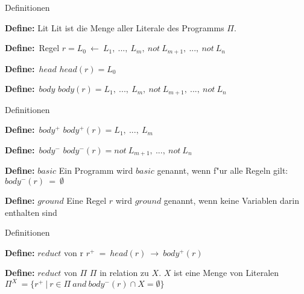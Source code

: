 \begin{frame}{Definitionen}
  \begin{block}{\textbf{Define:} Lit}
    Lit ist die Menge aller Literale des Programms $\Pi$.
  \end{block}
  \begin{block}{\textbf{Define:}~Regel}
    $r = L_0~\leftarrow~L_1,~...,~L_m,~not~L_{m+1},~...,~not~L_n$
  \end{block}
  \begin{block}{\textbf{Define:}~$head$}
    $head(r) = L_0$
  \end{block}
  \begin{block}{\textbf{Define:}~$body$}
    $body(r) = {L_1,~...,~L_m,~not~L_{m+1},~...,~not~L_n}$
  \end{block}
\end{frame}


\begin{frame}{Definitionen}
  \begin{block}{\textbf{Define:}~$body^+$}
    $body^+(r) = {L_1,~...,~L_m}$
  \end{block}
  \begin{block}{\textbf{Define:}~$body^-$}
    $body^-(r) = {not~L_{m+1},~...,~not~L_n}$
  \end{block}
  \begin{block}{\textbf{Define:} $basic$}
    Ein Programm wird $basic$ genannt, wenn f"ur alle Regeln gilt:\\
    $body^-(r)~=~\emptyset$
  \end{block}
  \begin{block}{\textbf{Define:} $ground$}
    Eine Regel $r$ wird $ground$ genannt, wenn keine Variablen darin enthalten sind\\
  \end{block}
\end{frame}


\begin{frame}{Definitionen}
  \begin{block}{\textbf{Define:} $reduct$ von r}
    $r^+~=~head(r)~\rightarrow~body^+(r)$
  \end{block}
  \begin{block}{\textbf{Define:} $reduct$ von $\Pi$}
    $\Pi$ in relation zu $X$. $X$ ist eine Menge von Literalen\\
    $\Pi^X~=\{r^+~|~r \in \Pi~and~body^-(r) \cap X = \emptyset \}$
  \end{block}
\end{frame}


